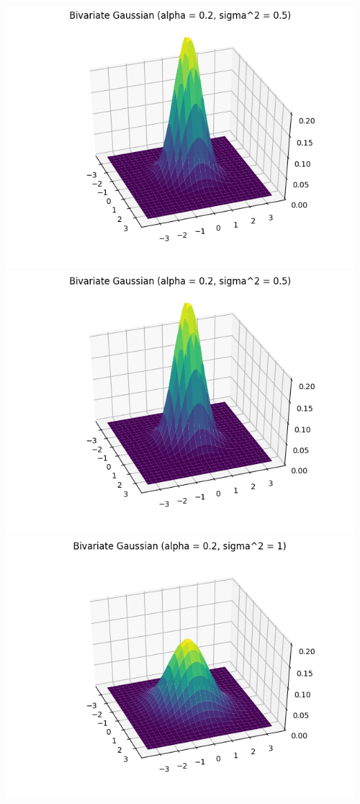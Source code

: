 \documentclass{article}
\begin{document}
\includegraphics[width=\linewidth]{Bivariate Gaussian (alpha = 0.2, sigma^2 = 0.5).png}
\includegraphics[width=\linewidth]{Bivariate Gaussian (alpha = 0.2, sigma^2 = 0.5).png}
\includegraphics[width=\linewidth]{Bivariate Gaussian (alpha = 0.2, sigma^2 = 1).png}
\end{document}
